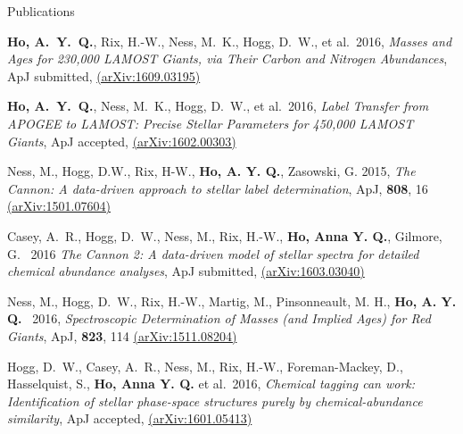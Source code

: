 \documentclass{resume} %
\begin{document}

\begin{rSection}{Publications}

\textbf{Ho, A.~Y.~Q.}, Rix, H.-W., Ness, M.~K., Hogg, D.~W., et al.\ 2016, 
\emph{Masses and Ages for 230,000 LAMOST Giants,
via Their Carbon and Nitrogen Abundances},
ApJ submitted,
\href{http://arxiv.org/abs/1609.03195}{(arXiv:1609.03195)}

\textbf{Ho, A.~Y.~Q.}, Ness, M.~K., Hogg, D.~W., et al.\ 2016, 
\emph{Label Transfer from APOGEE to LAMOST: Precise Stellar Parameters for 
450,000 LAMOST Giants},
ApJ accepted,
\href{http://arxiv.org/abs/1602.00303}{(arXiv:1602.00303)}

Ness, M., Hogg, D.W., Rix, H-W., \textbf{Ho, A. Y. Q.}, Zasowski, G. 2015,
\emph{The Cannon: A data-driven approach to stellar label determination}, ApJ,
\textbf{808}, 16 \href{http://arxiv.org/abs/1501.07604}{(arXiv:1501.07604)}

  Casey, A.~R., Hogg, D.~W., Ness, M., Rix, H.-W., 
  \textbf{Ho, Anna Y. Q.}, Gilmore, G. \ 2016
  \emph{The Cannon 2: 
    A data-driven model of stellar spectra for detailed 
  chemical abundance analyses},
  ApJ submitted,
  \href{http://arxiv.org/abs/1603.03040}{(arXiv:1603.03040)}

Ness, M., Hogg, D.~W., Rix, H.-W., Martig, M., Pinsonneault, M. H.,
\textbf{Ho, A. Y. Q.} \ 2016, 
\emph{Spectroscopic Determination of Masses (and Implied Ages) for Red Giants},
ApJ, \textbf{823}, 114 \href{http://arxiv.org/abs/1511.08204}
{(arXiv:1511.08204)}

  Hogg, D.~W., Casey, A.~R., Ness, M., Rix, H.-W., Foreman-Mackey, D., 
  Hasselquist, S., \textbf{Ho, Anna Y. Q.} et al.\ 2016,
  \emph{Chemical tagging can work: Identification of stellar 
  phase-space structures purely by chemical-abundance similarity},
  ApJ accepted,
  \href{http://arxiv.org/abs/1601.05413}{(arXiv:1601.05413)}

\end{rSection}

\end{document}
